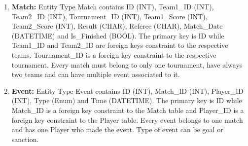 \begin{enumerate}
    \item \textbf{Match:} Entity Type Match contains ID (INT), Team1\_ID (INT), Team2\_ID (INT), Tournament\_ID (INT), Team1\_Score (INT), Team2\_Score (INT), Result (CHAR), Referee (CHAR), Match\_Date (DATETIME) and Is\_Finished (BOOL). The primary key is ID while Team1\_ID and Team2\_ID are foreign keys constraint to the respective teams. Tournament\_ID is a foreign key constraint to the respective tournament. Every match must belong to only one tournament, have always two teams and can have multiple event associated to it.

    \item \textbf{Event:} Entity Type Event contains ID (INT), Match\_ID (INT), Player\_ID (INT), Type (Enum) and Time (DATETIME). The primary key is ID while Match\_ID is a foreign key constraint to the Match table and Player\_ID is a foreign key constraint to the Player table. Every event belongs to one match and has one Player who made the event. Type of event can be goal or sanction.
\end{enumerate}